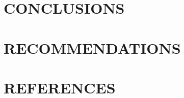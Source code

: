 \documentclass[titlepage, 12pt]{article}
\let\oldsection\section
\renewcommand\section[1]{\oldsection{\MakeUppercase{#1}}}
\begin{document}
\lipsum

\section{Conclusions}

\lipsum

\section{Recommendations}

\lipsum

\newpage
\setcounter{secnumdepth}{0}  %
\section{References}

\printbibliography[heading=none]
\end{document}
